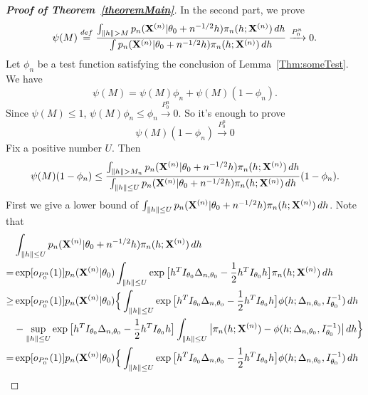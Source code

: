 \documentclass[11pt]{article}
\theoremstyle{plain}
\theoremstyle{definition}
\theoremstyle{remark}
\begin{document}
\begin{appendices}
\begin{proof}[\textbf{Proof of Theorem~\ref{theoremMain}}]
In the second part, we prove
\begin{equation}\label{eq:4}
    \psi(M)\overset{def}{=}\frac{\int_{\|h\|> M}p_n(\BX^{(n)}|\theta_0+n^{-1/2}h)\pi_n(h;\BX^{(n)})\, dh}{\int p_n(\BX^{(n)}|\theta_0+n^{-1/2}h)\pi_n(h;\BX^{(n)})\, dh}
    \xrightarrow{P_0^n}0.
\end{equation}
    Let $\phi_n$ be a test function satisfying the conclusion of Lemma~\ref{Thm:someTest}. We have
\begin{equation*}
    \psi(M)
    = 
    \psi(M)\phi_n
    +
    \psi(M)(1-\phi_n).
\end{equation*}
    Since $\psi(M)\leq 1$, 
    $
    \psi(M)\phi_n\leq \phi_n\xrightarrow{P_0^n}0
    $.
So it's enough to prove
\begin{equation*}
    \psi(M)(1-\phi_n)\xrightarrow{P_0^n}0
\end{equation*}
Fix a positive number $U$. Then
\begin{equation}\label{eq:11}
\psi(M)(1-\phi_n)
    \leq \frac{\int_{\|h\|>M_n}p_n(\BX^{(n)}|\theta_0+n^{-1/2}h)\pi_n(h;\BX^{(n)})\, dh}{\int_{\|h\|\leq U} p_n(\BX^{(n)}|\theta_0+n^{-1/2}h)\pi_n(h;\BX^{(n)})\, dh}(1-\phi_n).
\end{equation}
    First we give a lower bound of $\int_{\|h\|\leq U} p_n(\mathbf{X}^{(n)}|\theta_0+n^{-1/2}h)\pi_n(h;\mathbf{X}^{(n)})\, dh$.
 Note that
\begin{equation*}
    \begin{aligned}
        &\int_{\|h\|\leq U} p_n(\BX^{(n)}|\theta_0+n^{-1/2}h)\pi_n(h;\BX^{(n)})\, dh
\\
        = &
        \exp[o_{P_0^n}(1)]
        p_n(\BX^{(n)}|\theta_0)
        \int_{\|h\|\leq U}\exp\big[ h^T I_{\theta_0}\Delta_{n,\theta_0}-\frac{1}{2}h^T I_{\theta_0} h\big]\pi_n(h;\BX^{(n)})\, dh
        \\
        \geq &
        \exp[o_{P_0^n}(1)]
        p_n(\BX^{(n)}|\theta_0)
        \Big\{
            \int_{\|h\|\leq U}\exp\big[ h^T I_{\theta_0}\Delta_{n,\theta_0}-\frac{1}{2}h^T I_{\theta_0} h\big]\phi(h;\Delta_{n,\theta_0},I_{\theta_0}^{-1})\, dh
            \\
            &-
            \sup_{\|h\|\leq U}\exp\big[ h^T I_{\theta_0}\Delta_{n,\theta_0}-\frac{1}{2}h^T I_{\theta_0} h\big]
            \int_{\|h\|\leq U}\big|\pi_n(h;\BX^{(n)})-\phi(h;\Delta_{n,\theta_0},I_{\theta_0}^{-1})\big|\, dh
            \Big\}
        \\
        = &
        \exp[o_{P_0^n}(1)]
        p_n(\BX^{(n)}|\theta_0)
        \Big\{
            \int_{\|h\|\leq U}\exp\big[ h^T I_{\theta_0}\Delta_{n,\theta_0}-\frac{1}{2}h^T I_{\theta_0} h\big]\phi(h;\Delta_{n,\theta_0},I_{\theta_0}^{-1})\, dh

\end{aligned}
\end{equation*}
\end{proof}
\end{appendices}
\end{document}
